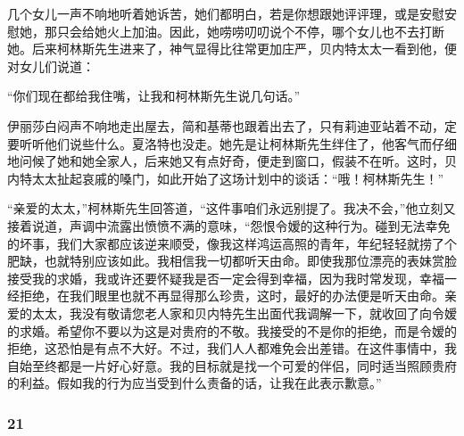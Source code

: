 \par 几个女儿一声不响地听着她诉苦，她们都明白，若是你想跟她评评理，或是安慰安慰她，那只会给她火上加油。因此，她唠唠叨叨说个不停，哪个女儿也不去打断她。后来柯林斯先生进来了，神气显得比往常更加庄严，贝内特太太一看到他，便对女儿们说道：
\par “你们现在都给我住嘴，让我和柯林斯先生说几句话。”
\par 伊丽莎白闷声不响地走出屋去，简和基蒂也跟着出去了，只有莉迪亚站着不动，定要听听他们说些什么。夏洛特也没走。她先是让柯林斯先生绊住了，他客气而仔细地问候了她和她全家人，后来她又有点好奇，便走到窗口，假装不在听。这时，贝内特太太扯起哀戚的嗓门，如此开始了这场计划中的谈话：“哦！柯林斯先生！”
\par “亲爱的太太，”柯林斯先生回答道，“这件事咱们永远别提了。我决不会，”他立刻又接着说道，声调中流露出愤愤不满的意味，“怨恨令嫒的这种行为。碰到无法幸免的坏事，我们大家都应该逆来顺受，像我这样鸿运高照的青年，年纪轻轻就捞了个肥缺，也就特别应该如此。我相信我一切都听天由命。即使我那位漂亮的表妹赏脸接受我的求婚，我或许还要怀疑我是否一定会得到幸福，因为我时常发现，幸福一经拒绝，在我们眼里也就不再显得那么珍贵，这时，最好的办法便是听天由命。亲爱的太太，我没有敬请您老人家和贝内特先生出面代我调解一下，就收回了向令嫒的求婚。希望你不要以为这是对贵府的不敬。我接受的不是你的拒绝，而是令嫒的拒绝，这恐怕是有点不大好。不过，我们人人都难免会出差错。在这件事情中，我自始至终都是一片好心好意。我的目标就是找一个可爱的伴侣，同时适当照顾贵府的利益。假如我的行为应当受到什么责备的话，让我在此表示歉意。”



\subsubsection*{21}

